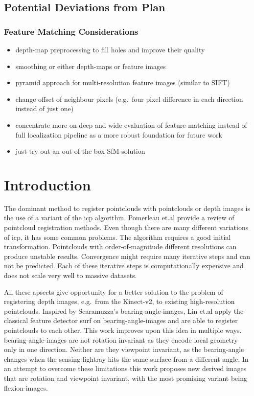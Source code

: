 \subsection{Potential Deviations from Plan}

\subsubsection*{Feature Matching Considerations}
\begin{itemize}
    \item depth-map preprocessing to fill holes and improve their quality
    \item smoothing or either depth-maps or feature images
    \item pyramid approach for multi-resolution feature images (similar to SIFT)
    \item change offset of neighbour pixels (e.g.~four pixel difference in each direction instead of just one)
    \item concentrate more on deep and wide evaluation of feature matching instead of full localization pipeline as a more robust foundation for future work
    \item just try out an out-of-the-box SfM-solution
\end{itemize}

\section{Introduction}

The dominant method to register pointclouds with pointclouds or depth
images is the use of a variant of the \gls{icp}\cite{Besl1992}
algorithm. Pomerleau et.al\cite{Pomerleau2015} provide a review of pointcloud registration methods.
Even though there are many different variations of \gls{icp}, it has
some common problems. The algorithm requires a good initial
transformation. Pointclouds with order-of-magnitude different
resolutions can produce unstable results. Convergence might require many
iterative steps and can not be predicted. Each of these iterative steps
is computationally expensive and does not scale very well to massive
datasets.

All these apsects give opportunity for a better solution to the problem
of registering depth images, e.g.~from the Kinect-v2, to existing
high-resolution pointclouds.
Inspired by Scaramuzza's \Glspl{bearing-angle-image}\cite{Scaramuzza2007}, Lin et.al\cite{Lin2017} apply the classical feature detector \gls{surf}\cite{Bay2006} on \Glspl{bearing-angle-image} and are able to register pointclouds to each other.
This work improves upon this idea in multiple ways.
\Glspl{bearing-angle-image} are not rotation invariant as they encode local geometry only in one direction.
Neither are they viewpoint invariant, as the \gls{bearing-angle} changes when the sensing lightray hits the same surface from a different angle.
In an attempt to overcome these limitations this work proposes new derived images that are rotation and viewpoint invariant, with the most promising variant being \Glspl{flexion-image}.

